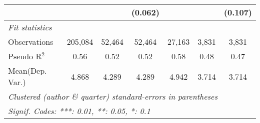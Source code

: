 \begin{tabular}{lcccccc}
                                 &               &               & (0.062)       &               &             & (0.107)\\   
   \midrule
   \emph{Fit statistics}\\
   Observations                  & 205,084       & 52,464        & 52,464        & 27,163        & 3,831       & 3,831\\  
   Pseudo R$^2$                  & 0.56          & 0.52          & 0.52          & 0.58          & 0.48        & 0.47\\  
Mean(Dep. Var.) & 4.868 & 4.289 & 4.289 & 4.942 & 3.714 & 3.714 \\
   \midrule \midrule
   \multicolumn{7}{l}{\emph{Clustered (author \& quarter) standard-errors in parentheses}}\\
   \multicolumn{7}{l}{\emph{Signif. Codes: ***: 0.01, **: 0.05, *: 0.1}}\\
\end{tabular}
\par\endgroup
